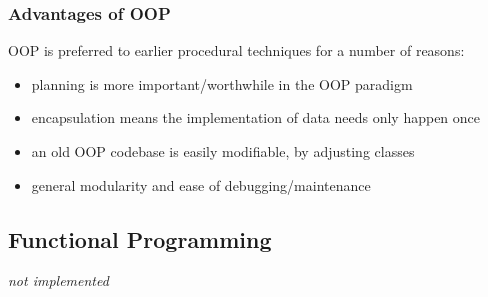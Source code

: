\documentclass[9pt]{article}
\begin{document}
\subsubsection{Advantages of OOP}
\label{sec:orgaf57bd7}

OOP is preferred to earlier procedural techniques for a number of reasons:

\begin{itemize}
\item planning is more important/worthwhile in the OOP paradigm
\item encapsulation means the implementation of data needs only happen once
\item an old OOP codebase is easily modifiable, by adjusting classes
\item general modularity and ease of debugging/maintenance
\end{itemize}

\subsection{Functional Programming}
\label{sec:org1ac7623}

\emph{not implemented}
\end{document}
